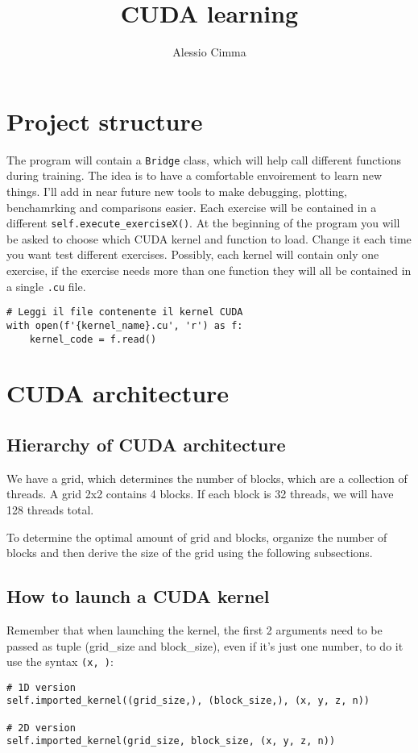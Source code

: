 \documentclass{article}
\title{CUDA learning}
\author{Alessio Cimma}
\begin{document}
\maketitle
\newpage

\tableofcontents
\newpage

\section{Project structure}

The program will contain a \texttt{Bridge} class, which will help call different functions during training. The idea is to have a comfortable envoirement to learn new things. I'll add in near future new tools to make debugging, plotting, benchamrking and comparisons easier. Each exercise will be contained in a different \texttt{self.execute\_exerciseX()}. At the beginning of the program you will be asked to choose which CUDA kernel and function to load. Change it each time you want test different exercises. Possibly, each kernel will contain only one exercise, if the exercise needs more than one function they will all be contained in a single \texttt{.cu} file.

\begin{lstlisting}[caption=Loading CUDA kernel (kernel.cu)]
# Leggi il file contenente il kernel CUDA
with open(f'{kernel_name}.cu', 'r') as f:
    kernel_code = f.read()
\end{lstlisting}

\newpage
\section{CUDA architecture}

\subsection{Hierarchy of CUDA architecture}
We have a grid, which determines the number of blocks, which are a collection of threads. A grid 2x2 contains 4 blocks. If each block is 32 threads, we will have 128 threads total.

To determine the optimal amount of grid and blocks, organize the number of blocks and then derive the size of the grid using the following subsections.

\subsection{How to launch a CUDA kernel} Remember that when launching the kernel, the first 2 arguments need to be passed as tuple (grid\_size and block\_size), even if it's just one number, to do it use the syntax \texttt{(x, )}:
\begin{lstlisting}[caption=Launch CUDA kernel]
# 1D version
self.imported_kernel((grid_size,), (block_size,), (x, y, z, n)) 

# 2D version
self.imported_kernel(grid_size, block_size, (x, y, z, n)) 
\end{lstlisting}
\end{document}
